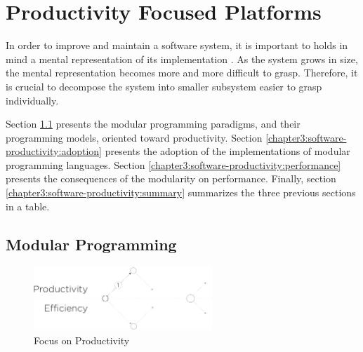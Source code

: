 \section{Productivity Focused Platforms} \label{chapter3:software-productivity}


In order to improve and maintain a software system, it is important to holds in mind a mental representation of its implementation \cite{Simon1962}.
As the system grows in size, the mental representation becomes more and more difficult to grasp.
Therefore, it is crucial to decompose the system into smaller subsystem easier to grasp individually.


Section \ref{chapter3:software-productivity:modularity} presents the modular programming paradigms, and their programming models, oriented toward productivity.
Section \ref{chapter3:software-productivity:adoption} presents the adoption of the implementations of modular programming languages.
Section \ref{chapter3:software-productivity:performance} presents the consequences of the modularity on performance.
Finally, section \ref{chapter3:software-productivity:summary} summarizes the three previous sections in a table.

\subsection{Modular Programming} \label{chapter3:software-productivity:modularity}

\begin{figure}[!h]
\begin{center}
\includegraphics[width=0.6\textwidth]{../resources/state-of-the-art-1.pdf}
\end{center}
\caption{Focus on Productivity}
\label{fig:state-of-the-art-1}
\end{figure}

